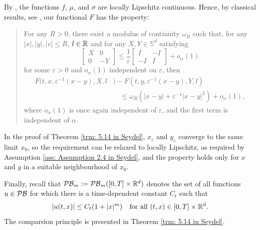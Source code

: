 By , the functions $f$, $\mu$, and $\sigma$ are locally Lipschitz continuous. Hence, by classical results, see {\cite[Lemma V.7.1]{fleming2006controlled}}, our functional $F$ has the property:
\begin{quote}
    For any $R>0$, there exist a modulus of continuity $\omega_R$ such that, for any $|x|,|y|,|v| \leq R$, $l \in \mathbb{R}$ and for any $X,Y \in \mathbb S^d$ satisfying 
    \begin{equation*}
        \begin{bmatrix}
            X & 0\\
            0 & -Y
        \end{bmatrix}
        \leq 
        \frac 1 \varepsilon
        \begin{bmatrix}
            I & -I\\
            -I & I
        \end{bmatrix}
        + o_\alpha(1)
    \end{equation*} 
    for some $\varepsilon > 0$ and $o_\alpha(1)$ independent on $\varepsilon$, then
    \begin{align*}
        F(t,x,\varepsilon^{-1} (x-y), X, l&) - F(t,y,\varepsilon^{-1} (x-y), Y, l) \\
        &\quad \leq \omega_R (|x-y| + \varepsilon^{-1} |x-y|^2) + o_\alpha(1),
    \end{align*}
    where $o_\alpha(1)$ is once again independent of $\varepsilon$, and the first term is independent of $\alpha$. 
\end{quote}
In the proof of Theorem \ref{trm: 5.14 in Seydel}, $x_\varepsilon$ and $y_\varepsilon$ converge to the same limit $x_0$, so the requirement can be
relaxed to locally Lipschitz, as required by Assumption \ref{ass: Assumption 2.4 in Seydel}, and the property holds only for $x$ and $y$ in a suitable neighbourhood of $x_0$. 

Finally, recall that $\mathcal{PB}_m:=\mathcal{PB}_m ([0,T] \times \mathbb{R}^d)$ denotes the set of all functions $u \in \mathcal{PB}$ for which there is a time-dependent constant $C_t$ such that
\begin{equation*}
    |u(t,x)| \leq C_t (1+|x|^m) \quad \text{for all } (t,x) \in [0,T]\times \mathbb{R}^d.
\end{equation*}
The comparsion principle is presented in Theorem \ref{trm: 5.14 in Seydel}. 

